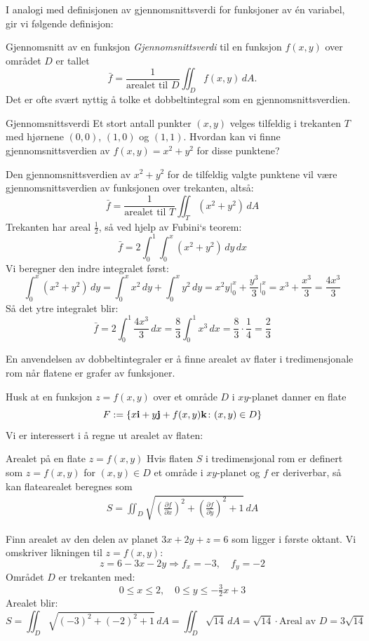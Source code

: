 I analogi med definisjonen av gjennomsnittsverdi for funksjoner av én variabel, gir vi følgende definisjon:
\begin{defn}{Gjennomsnitt av en funksjon}
\emph{Gjennomsnittsverdi} til en funksjon \( f(x,y) \) over området \( D \) er tallet
\[
\bar{f} =
\frac{1}{\text{arealet til } D}
\iint_D f(x,y)\,dA.
\]
Det er ofte svært nyttig å tolke et dobbeltintegral som en gjennomsnittsverdien.
\end{defn}

\begin{eks}{Gjennomsnittsverdi}
Et stort antall punkter \( (x, y) \) velges tilfeldig i trekanten \( T \) med hjørnene \( (0,0) \), \( (1,0) \) og \( (1,1) \). Hvordan kan vi finne gjennomsnittsverdien av \( f(x,y)= x^2 + y^2 \) for disse punktene?

Den gjennomsnittsverdien av \( x^2 + y^2 \) for de tilfeldig valgte punktene vil være gjennomsnittsverdien av funksjonen over trekanten, altså:
\[
\bar{f} = \frac{1}{\text{arealet til } T} \iint_T (x^2 + y^2)\, dA
\]
Trekanten har areal \( \frac{1}{2} \), så ved hjelp av Fubini`s teorem:
\[
\bar{f} = 2 \int_0^1 \int_0^x (x^2 + y^2)\, dy\, dx
\]
Vi beregner den indre integralet først:
\[
\int_0^x (x^2 + y^2)\, dy = \int_0^x x^2\, dy + \int_0^x y^2\, dy = x^2 y \big|_0^x + \frac{y^3}{3} \big|_0^x = x^3 + \frac{x^3}{3} = \frac{4x^3}{3}
\]
Så det ytre integralet blir:
\[
\bar{f} = 2 \int_0^1 \frac{4x^3}{3}\, dx = \frac{8}{3} \int_0^1 x^3\, dx = \frac{8}{3} \cdot \frac{1}{4} = \frac{2}{3}
\]
\end{eks}

En anvendelsen av dobbeltintegraler er å finne arealet av flater i tredimensjonale rom når flatene er grafer av funksjoner. 

Husk at en funksjon $z = f(x, y)$ over et område $D$ i $xy$-planet danner en flate 
\[F :=\{x\mathbf{i}+y\mathbf{j}+f(x,y)\mathbf{k} \colon (x,y) \in D\}\]
Vi er interessert i å regne ut arealet av flaten:
\begin{oppsum}{Arealet på en flate $z=f(x,y)$}
Hvis flaten $S$ i tredimensjonal rom er definert som $z=f(x,y)$ for $(x,y) \in D$ et område i $xy$-planet og $f$ er deriverbar, så kan flatearealet beregnes som 
\begin{align} \label{anv:flateareal}
S = \iint_D \sqrt{\left( \frac{\partial f}{\partial x} \right)^2 + \left( \frac{\partial f}{\partial y} \right)^2 + 1}\, dA
\end{align}
\end{oppsum}

\begin{eks}{}
Finn arealet av den delen av planet $3x + 2y + z = 6$ som ligger i første oktant. Vi omskriver likningen til $z = f(x, y)$:
\[
z = 6 - 3x - 2y \Rightarrow f_x = -3, \quad f_y = -2
\]
Området $D$ er trekanten med:
\[
0 \leq x \leq 2, \quad 0 \leq y \leq -\tfrac{3}{2}x + 3
\]
Arealet blir:
\[
S = \iint_D \sqrt{(-3)^2 + (-2)^2 + 1}\, dA = \iint_D \sqrt{14}\, dA = \sqrt{14} \cdot \text{Areal av } D = 3\sqrt{14}
\]
\end{eks}

